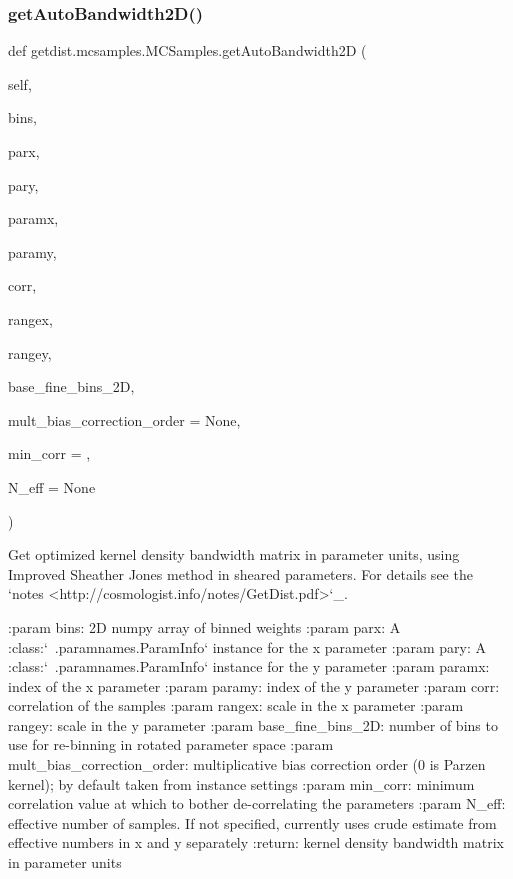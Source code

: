 \subsubsection{\texorpdfstring{get\+Auto\+Bandwidth2\+D()}{getAutoBandwidth2D()}}
{\footnotesize\ttfamily def getdist.\+mcsamples.\+M\+C\+Samples.\+get\+Auto\+Bandwidth2D (\begin{DoxyParamCaption}\item[{}]{self,  }\item[{}]{bins,  }\item[{}]{parx,  }\item[{}]{pary,  }\item[{}]{paramx,  }\item[{}]{paramy,  }\item[{}]{corr,  }\item[{}]{rangex,  }\item[{}]{rangey,  }\item[{}]{base\+\_\+fine\+\_\+bins\+\_\+2D,  }\item[{}]{mult\+\_\+bias\+\_\+correction\+\_\+order = {\ttfamily None},  }\item[{}]{min\+\_\+corr = {},  }\item[{}]{N\+\_\+eff = {\ttfamily None} }\end{DoxyParamCaption})}

\begin{DoxyVerb}Get optimized kernel density bandwidth matrix in parameter units, using Improved Sheather Jones method in sheared parameters.
For details see the `notes <http://cosmologist.info/notes/GetDist.pdf>`_.

:param bins: 2D numpy array of binned weights
:param parx: A :class:`~.paramnames.ParamInfo` instance for the x parameter
:param pary: A :class:`~.paramnames.ParamInfo` instance for the y parameter
:param paramx: index of the x parameter
:param paramy: index of the y parameter
:param corr: correlation of the samples
:param rangex: scale in the x parameter
:param rangey: scale in the y parameter
:param base_fine_bins_2D: number of bins to use for re-binning in rotated parameter space
:param mult_bias_correction_order: multiplicative bias correction order (0 is Parzen kernel); by default taken from instance settings
:param min_corr: minimum correlation value at which to bother de-correlating the parameters
:param N_eff: effective number of samples. If not specified, currently uses crude estimate from effective numbers in x and y separately
:return: kernel density bandwidth matrix in parameter units
\end{DoxyVerb}
 

